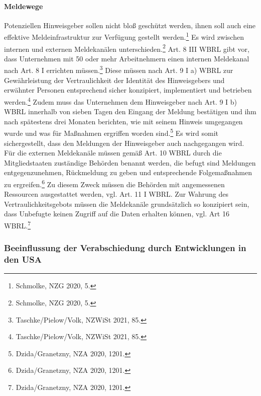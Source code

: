 \paragraph{Meldewege}
Potenziellen Hinweisgeber sollen nicht bloß geschützt werden, ihnen soll auch eine effektive Meldeinfrastruktur zur Verfügung gestellt werden.\footnote{Schmolke, NZG 2020, 5.}
Es wird zwischen internen und externen Meldekanälen unterschieden.\footnote{Schmolke, NZG 2020, 5.}
Art. 8 III WBRL gibt vor, dass Unternehmen mit 50 oder mehr Arbeitnehmern einen internen Meldekanal nach Art. 8 I errichten müssen.\footnote{Taschke/Pielow/Volk, NZWiSt 2021, 85.}
Diese müssen nach Art. 9 I a) WBRL zur Gewährleistung der Vertraulichkeit der Identität des Hinweisgebers und erwähnter Personen entsprechend sicher konzipiert, implementiert und betrieben werden.\footnote{Taschke/Pielow/Volk, NZWiSt 2021, 85.}
Zudem muss das Unternehmen dem Hinweisgeber nach Art. 9 I b) WBRL innerhalb von sieben Tagen den Eingang der Meldung bestätigen und ihm nach spätestens drei Monaten berichten, wie mit seinem Hinweis umgegangen wurde und was für Maßnahmen ergriffen worden sind.\footnote{Dzida/Granetzny, NZA 2020, 1201.}
Es wird somit sichergestellt, dass den Meldungen der Hinweisgeber auch nachgegangen wird.\\
Für die externen Meldekanäle müssen gemäß Art. 10 WBRL durch die Mitgliedstaaten zuständige Behörden benannt werden, die befugt sind Meldungen entgegenzunehmen, Rückmeldung zu geben und entsprechende Folgemaßnahmen zu ergreifen.\footnote{Dzida/Granetzny, NZA 2020, 1201.}
Zu diesem Zweck müssen die Behörden mit angemessenen Ressourcen ausgestattet werden, vgl. Art. 11 I WBRL.
Zur Wahrung des Vertraulichkeitsgebots müssen die Meldekanäle grundsätzlich so konzipiert sein, dass Unbefugte keinen Zugriff auf die Daten erhalten können, vgl. Art 16 WBRL.\footnote{Dzida/Granetzny, NZA 2020, 1201.}



\subsubsection{Beeinflussung der Verabschiedung durch Entwicklungen in den USA}

